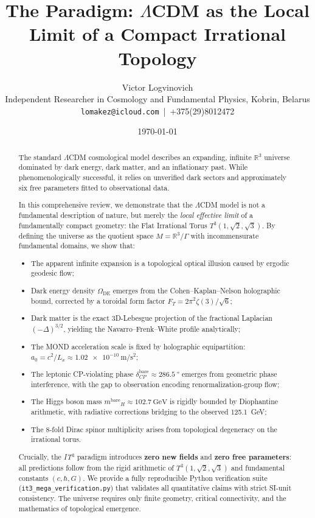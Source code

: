 \documentclass[12pt, a4paper]{article}
\title{The \ITthree{} Paradigm: $\Lambda$CDM as the Local Limit of a Compact Irrational Topology}
\author{Victor Logvinovich \\ \small Independent Researcher in Cosmology and Fundamental Physics, Kobrin, Belarus \\ \small \texttt{lomakez@icloud.com} \,|\, +375(29)8012472}
\date{\today}
\newcommand{\ITthree}{\textit{IT}\ensuremath{^3}}
\newcommand{\Tthree}{\ensuremath{T^3(1,\sqrt{2},\sqrt{3})}}
\newcommand{\Lx}{\ensuremath{L_x}}
\newcommand{\bare}[1]{\ensuremath{#1^{\text{bare}}}}
\newcommand{\code}[1]{\texttt{#1}}
\begin{document}
\maketitle

\begin{abstract}
\noindent
The standard $\Lambda$CDM cosmological model describes an expanding, infinite $\mathbb{R}^3$ universe dominated by dark energy, dark matter, and an inflationary past. While phenomenologically successful, it relies on unverified dark sectors and approximately six free parameters fitted to observational data.

In this comprehensive review, we demonstrate that the $\Lambda$CDM model is not a fundamental description of nature, but merely the \textit{local effective limit} of a fundamentally compact geometry: the Flat Irrational Torus \Tthree{}. By defining the universe as the quotient space $M = \mathbb{R}^3 / \Gamma$ with incommensurate fundamental domains, we show that:

\begin{itemize}[leftmargin=*]
  \item[(1)] The apparent infinite expansion is a topological optical illusion caused by ergodic geodesic flow;
  \item[(2)] Dark energy density $\Omega_{\text{DE}}$ emerges from the Cohen--Kaplan--Nelson holographic bound, corrected by a toroidal form factor $F_T = 2\pi^2\zeta(3)/\sqrt{6}$;
  \item[(3)] Dark matter is the exact 3D-Lebesgue projection of the fractional Laplacian $(-\Delta)^{3/2}$, yielding the Navarro--Frenk--White profile analytically;
  \item[(4)] The MOND acceleration scale is fixed by holographic equipartition: $a_0 = c^2/\Lx \approx \SI{1.02e-10}{\meter\per\second\squared}$;
  \item[(5)] The leptonic CP-violating phase $\delta_{CP}^{\text{bare}} \approx \SI{286.5}{\degree}$ emerges from geometric phase interference, with the gap to observation encoding renormalization-group flow;
  \item[(6)] The Higgs boson mass $\bare{m}_H \approx \SI{102.7}{\GeV}$ is rigidly bounded by Diophantine arithmetic, with radiative corrections bridging to the observed \SI{125.1}{\GeV};
  \item[(7)] The 8-fold Dirac spinor multiplicity arises from topological degeneracy on the irrational torus.
\end{itemize}

Crucially, the \ITthree{} paradigm introduces \textbf{zero new fields} and \textbf{zero free parameters}: all predictions follow from the rigid arithmetic of \Tthree{} and fundamental constants $(c, \hbar, G)$. We provide a fully reproducible Python verification suite (\code{it3\_mega\_verification.py}) that validates all quantitative claims with strict SI-unit consistency. The universe requires only finite geometry, critical connectivity, and the mathematics of topological emergence.
\end{abstract}
\end{document}
